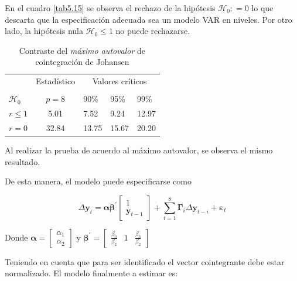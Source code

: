 En el cuadro \ref{tab5.15} se observa el rechazo de la hipótesis $\mathcal{H}_{0}: = 0$ lo que descarta que la especificación adecuada sea un modelo VAR en niveles. Por otro lado, la hipótesis nula $\mathcal{H}_{0}\leq 1$ no puede rechazarse. 


\begin{table}[!htpb]
\caption{Contraste del \textit{máximo autovalor} de cointegración de Johansen\label{tab5.16}}
\begin{center}
\begin{tabular}{@{}lrllll@{}}
\toprule
\multicolumn{1}{l}{} & \multicolumn{2}{c}{Estadístico} & \multicolumn{3}{c}{Valores críticos} \\
\cmidrule(l){2-3} \cmidrule(l){4-6} \\
\multicolumn{1}{l}{$\mathcal{H}_0$} & \multicolumn{2}{c}{$p = 8$} &
\multicolumn{1}{l}{90\%}&
\multicolumn{1}{l}{95\%}&
\multicolumn{1}{l}{99\%}
\\
\midrule
$r \leq 1$ & \multicolumn{2}{c}{5.01} & 7.52 & 9.24 & 12.97 \\
$r = 0$ & \multicolumn{2}{c}{32.84} & 13.75 & 15.67 & 20.20 \\
\bottomrule
\end{tabular}
\end{center}
\label{tab-11}
\end{table}

Al realizar la prueba de acuerdo al máximo autovalor, se observa el mismo resultado. 

De esta manera, el modelo puede especificarse como 

\begin{equation}
 \Delta\mathbf{y}_{t} = \boldsymbol{\alpha \beta}^{'}\left[\begin{array}{c}1 \\ \mathbf{y}_{t-1}\end{array}\right]+\sum_{i=1}^{8}\boldsymbol{\Gamma}_{i}\Delta\mathbf{y}_{t-i}+\boldsymbol{\varepsilon}_{t}
\end{equation}

Donde $\boldsymbol{\alpha}=\left[\begin{array}{c} \alpha_{1} \\ \alpha_{2} \end{array}\right]$ y $\boldsymbol{\beta}^{'} = \left[\begin{array}{ccc} \frac{\beta_{0}}{\beta_{2}} & 1 & \frac{\beta_{3}}{\beta_{2}} \end{array}\right]$

Teniendo en cuenta que para ser identificado el vector cointegrante debe estar normalizado. El modelo finalmente a estimar es: 

